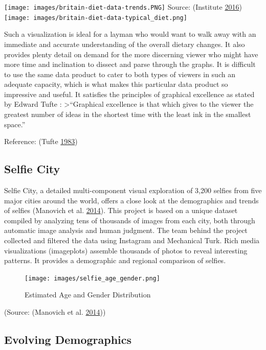 \documentclass[]{book}
\begin{document}
\texttt{[image: images/britain-diet-data-trends.PNG]}
Source: (Institute \protect\hyperlink{ref-britain_diet_2016}{2016})
\texttt{[image: images/britain-diet-data-typical\_diet.png]}

Such a visualization is ideal for a layman who would want to walk away with an immediate and accurate understanding of the overall dietary changes. It also provides plenty detail on demand for the more discerning viewer who might have more time and inclination to dissect and parse through the graphs. It is difficult to use the same data product to cater to both types of viewers in such an adequate capacity, which is what makes this particular data product so impressive and useful. It satisfies the principles of graphical excellence as stated by Edward Tufte :
\textgreater{}``Graphical excellence is that which gives to the viewer the greatest number of ideas in the shortest time with the least ink in the smallest space.''

Reference: (Tufte \protect\hyperlink{ref-visual_display}{1983})

\hypertarget{selfie-city}{%
\subsection{Selfie City}\label{selfie-city}}

Selfie City, a detailed multi-component visual exploration of 3,200 selfies from five major cities around the world, offers a close look at the demographics and trends of selfies (Manovich et al. \protect\hyperlink{ref-selfie}{2014}). This project is based on a unique dataset compiled by analyzing tens of thousands of images from each city, both through automatic image analysis and human judgment. The team behind the project collected and filtered the data using Instagram and Mechanical Turk. Rich media visualizations (imageplots) assemble thousands of photos to reveal interesting patterns. It provides a demographic and regional comparison of selfies.

\begin{figure}
\centering
\texttt{[image: images/selfie\_age\_gender.png]}
\caption{Estimated Age and Gender Distribution}
\end{figure}

(Source: (Manovich et al. \protect\hyperlink{ref-selfie}{2014}))

\hypertarget{evolving-demographics}{%
\subsection{Evolving Demographics}\label{evolving-demographics}}
\end{document}
